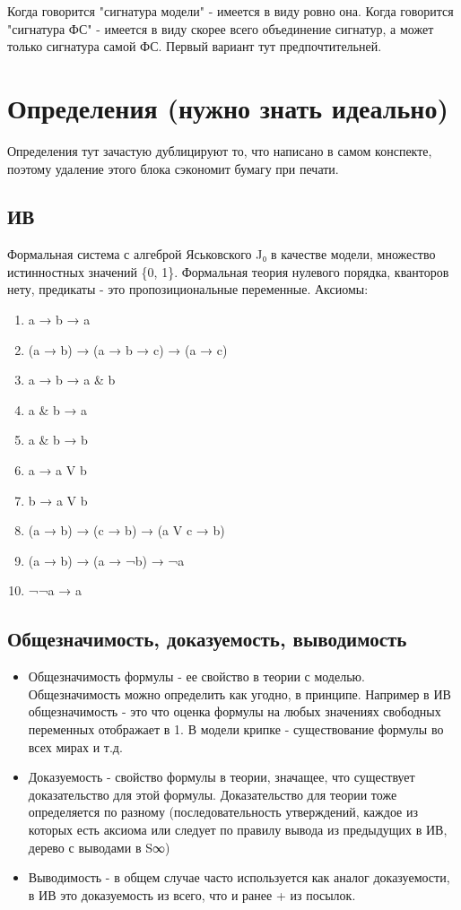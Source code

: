 \documentclass[11pt]{article}
\begin{document}
Когда говорится "сигнатура модели" - имеется в виду ровно она.
Когда говорится "сигнатура ФС" - имеется в виду скорее всего
объединение сигнатур, а может только сигнатура самой ФС. Первый
вариант тут предпочтительней.
\section{Определения (нужно знать идеально)}
\label{sec-2}
Определения тут зачастую дублицируют то, что написано в самом
конспекте, поэтому удаление этого блока сэкономит бумагу при
печати.
\subsection{ИВ}
\label{sec-2-1}
Формальная система с алгеброй Яськовского J₀ в качестве модели, множество
истинностных значений \{0, 1\}. Формальная теория нулевого порядка, кванторов
нету, предикаты - это пропозициональные переменные.
Аксиомы:
\begin{enumerate}
\item a → b → a
\item (a → b) → (a → b → c) → (a → c)
\item a → b → a \& b
\item a \& b → a
\item a \& b → b
\item a → a V b
\item b → a V b
\item (a → b) → (c → b) → (a V c → b)
\item (a → b) → (a → ¬b) → ¬a
\item ¬¬a → a
\end{enumerate}
\subsection{Общезначимость, доказуемость, выводимость}
\label{sec-2-2}
\begin{itemize}
\item Общезначимость формулы - ее свойство в теории с моделью. Общезначимость
можно определить как угодно, в принципе. Например в ИВ общезначимость -
это что оценка формулы на любых значениях свободных переменных отображает
в 1. В модели крипке - существование формулы во всех мирах и т.д.
\item Доказуемость - свойство формулы в теории, значащее, что существует
доказательство для этой формулы. Доказательство для теории тоже определяется
по разному (последовательность утверждений, каждое из которых есть аксиома
или следует по правилу вывода из предыдущих в ИВ, дерево с выводами в S∞)
\item Выводимость - в общем случае часто используется как аналог доказуемости,
в ИВ это доказуемость из всего, что и ранее + из посылок.
\end{itemize}
\end{document}
